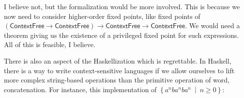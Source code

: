 I believe not, but the formalization would be more involved. This is because we now need to consider higher-order fixed points, like fixed points of $(\textsf{ContextFree}\rightarrow \textsf{ContextFree})\rightarrow  \textsf{ContextFree}\rightarrow \textsf{ContextFree}$. We would need a theorem giving us the existence of a privileged fixed point for such expressions. All of this is feasible, I believe.

There is also an aspect of the Haskellization which is regrettable. In Haskell, there is a way to write context-sensitive languages if we allow ourselves to lift more complex string-based operations than the primitive operation of word, concatenation. For instance, this implementation of $\left\lbrace a^nba^nba^n\ \middle|\ n\geq 0\right\rbrace$:



